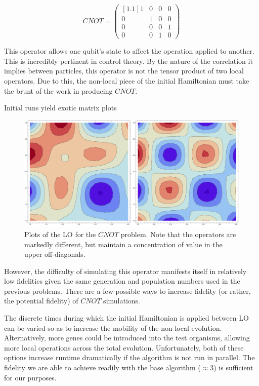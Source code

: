 \documentclass[11pt,twocolumn]{article}
\begin{document}
	\begin{equation}
	CNOT = 
	\begin{pmatrix}[1.1]
		1  &  0  &  0  &  0  \\
		0  &  1  &  0  &  0  \\
		0  &  0  &  0  &  1  \\
		0  &  0  &  1  &  0 
	\end{pmatrix}
	\end{equation}

	This operator allows one qubit's state to affect the operation applied to another. This is incredibly pertinent in control theory. By the nature of the correlation it implies between particles, this operator is not the tensor product of two local operators. Due to this, the non-local piece of the initial Hamiltonian must take the brunt of the work in producing $CNOT$. 

	Initial runs yield exotic matrix plots 
	
	\begin{figure}[htpb]
		\centering
			\includegraphics[scale=0.2]{cnot_matrices.png}
		\centering
		\caption{Plots of the LO for the $CNOT$ problem. Note that the operators are markedly different, but maintain a concentration of value in the upper off-diagonals.}
		\label{fig:cnot_matrix}
	\end{figure}

	However, the difficulty of simulating this operator manifests itself in relatively low fidelities given the same generation and population numbers used in the previous problems. There are a few possible ways to increase fidelity (or rather, the potential fidelity) of $CNOT$ simulations.

	The discrete times during which the initial Hamiltonian is applied between LO can be varied so as to increase the mobility of the non-local evolution. Alternatively, more genes could be introduced into the test organisms, allowing more local operations across the total evolution. Unfortunately, both of these options increase runtime dramatically if the algorithm is not run in parallel. The fidelity we are able to achieve readily with the base algorithm ($\approx3$) is sufficient for our purposes. 
\end{document}
